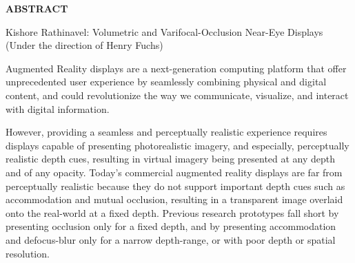 
\begin{center}
\vspace*{52pt}
{\Large \textbf{ABSTRACT}}
\vspace{11pt}

\begin{singlespace}
Kishore Rathinavel: Volumetric and Varifocal-Occlusion Near-Eye Displays\\
(Under the direction of Henry Fuchs)
\end{singlespace}
\end{center}

Augmented Reality displays are a next-generation computing platform that offer unprecedented user experience by seamlessly combining physical and digital content, and could revolutionize the way we communicate, visualize, and interact with digital information.

However, providing a seamless and perceptually realistic experience requires displays capable of presenting photorealistic imagery, and especially, perceptually realistic depth cues, resulting in virtual imagery being presented at any depth and of any opacity. Today's commercial augmented reality displays are far from perceptually realistic because they do not support important depth cues such as accommodation and mutual occlusion, resulting in a transparent image overlaid onto the real-world at a fixed depth. Previous research prototypes fall short by presenting occlusion only for a fixed depth, and by presenting accommodation and defocus-blur only for a narrow depth-range, or with poor depth or spatial resolution. 

